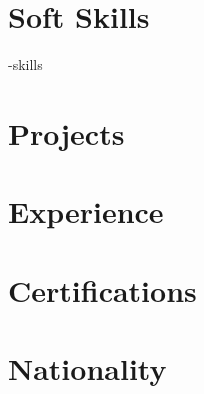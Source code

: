 \section*{Soft Skills}
\soft-skills

\bigskip

\section*{Projects}
\projects

\bigskip

\section*{Experience}
\experience

\bigskip

\section*{Certifications}
\certifications

\bigskip

\section*{Nationality}
\nationality

